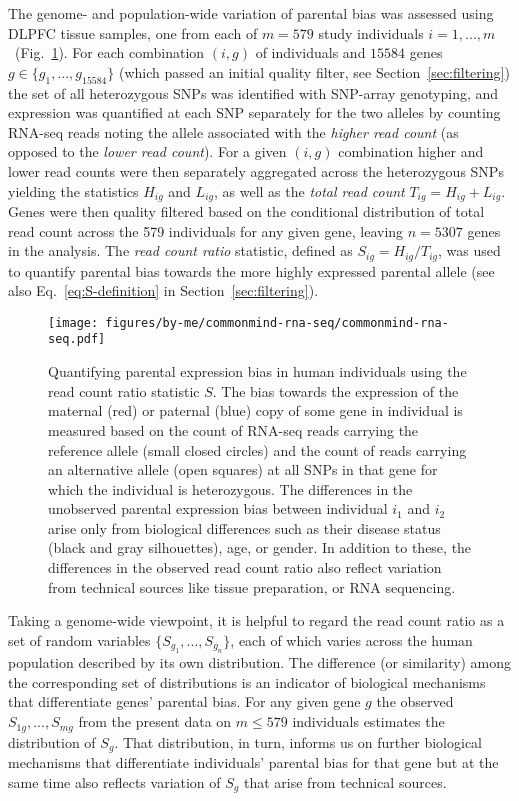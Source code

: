 \documentclass[letterpaper]{article}
\begin{document}
The genome- and population-wide variation of parental bias was assessed using
DLPFC tissue samples, one from each of \(m=579\) study individuals
\(i=1,...,m\)~(Fig.~\ref{fig:study-design}).
For each combination \((i,g)\) of individuals and \(15584\) genes
\(g\in\{g_1,...,g_{15584}\}\) (which passed an initial quality filter, see
Section~\ref{sec:filtering}) the set
of all heterozygous SNPs was identified with SNP-array genotyping, and
expression was quantified at each SNP separately for the two alleles by
counting RNA-seq reads noting the allele associated with the \emph{higher read
count} (as opposed to the \emph{lower read count}).  For a given \((i,g)\)
combination higher and lower read counts were then separately aggregated
across the heterozygous SNPs yielding the statistics \(H_{ig}\) and
\(L_{ig}\), as well as the \emph{total read count} \(T_{ig} = H_{ig} +
L_{ig}\).  Genes were then quality filtered based on the conditional
distribution of total read count across the 579 individuals for any given
gene, leaving \(n=5307\) genes in the analysis.  The \emph{read count ratio}
statistic, defined as \(S_{ig} = H_{ig}/T_{ig}\), was used to quantify
parental bias towards the more highly expressed parental allele (see also
Eq.~\ref{eq:S-definition} in Section~\ref{sec:filtering}).

\begin{figure}
\begin{center}
\texttt{[image: figures/by-me/commonmind-rna-seq/commonmind-rna-seq.pdf]}
\end{center}
\caption{
Quantifying parental expression bias in human individuals using the read count
ratio statistic \(S\).  The bias towards the expression of the maternal (red)
or paternal (blue) copy of some gene in individual is measured based on the
count of RNA-seq reads carrying the reference allele (small closed circles)
and the count of reads carrying an alternative allele (open squares) at all
SNPs in that gene for which the individual is heterozygous.  The differences
in the unobserved parental expression bias between individual \(i_1\) and
\(i_2\) arise only from biological differences such as their disease status
(black and gray silhouettes), age, or gender.  In addition to these, the differences in the observed read count ratio also reflect variation from technical sources like tissue preparation, or RNA sequencing.
}
\label{fig:study-design}
\end{figure}


Taking a genome-wide viewpoint, it is helpful to regard the read count ratio
as a set of random variables \(\{S_{g_1},...,S_{g_n}\}\), each of which varies
across the human population described by its own distribution.  The difference
(or similarity) among the corresponding set of distributions is an indicator
of biological mechanisms that differentiate genes' parental bias.  For any
given gene \(g\) the observed \(S_{1g},...,S_{mg}\) from the present data on
\(m\le579\) individuals estimates the distribution of \(S_g\).  That
distribution, in turn, informs us on further biological mechanisms that
differentiate individuals' parental bias for that gene but at the same time
also reflects variation of \(S_g\) that arise from technical sources.
\end{document}
